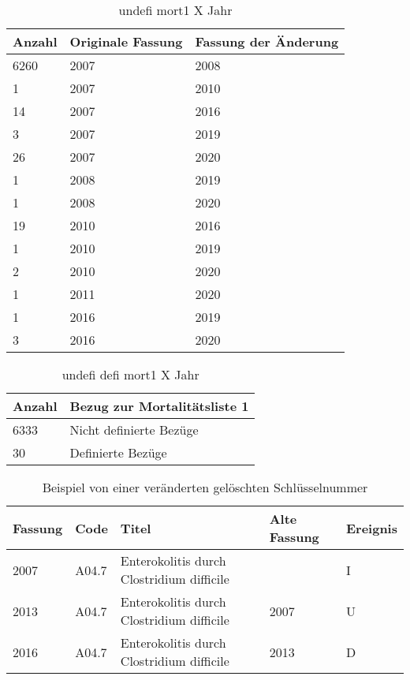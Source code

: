 \begin{table}[ht]
	\centering
	\caption[Undefinierte Bezüge zur Mortalitätsliste 1]{undefi mort1 X Jahr}
	\label{tab:mort1}
	\begin{tabular}{|l|l|l|}
		\hline
		\rowcolor{lightgray} Anzahl & Originale Fassung & Fassung der Änderung \\ \hline
		6260 & 2007 & 2008 \\ \hline
		1 & 2007 & 2010 \\ \hline
		14 & 2007 & 2016 \\ \hline
		3 & 2007 & 2019 \\ \hline
		26 & 2007 & 2020 \\ \hline
		1 & 2008 & 2019 \\ \hline
		1 & 2008 & 2020 \\ \hline
		19 & 2010 & 2016 \\ \hline
		1 & 2010 & 2019 \\ \hline
		2 & 2010 & 2020 \\ \hline
		1 & 2011 & 2020 \\ \hline
		1 & 2016 & 2019 \\ \hline
		3 & 2016 & 2020 \\ \hline	
	\end{tabular}
\end{table}

\newpage

\begin{table}[ht]
	\centering
	\caption[Undefinierte und definierte Bezüge zur Mortalitätsliste 1]{undefi defi mort1 X Jahr}
	\label{tab:mort1defundef}
	\begin{tabular}{|l|l|}
		\hline
		\rowcolor{lightgray} Anzahl & Bezug zur Mortalitätsliste 1 \\ \hline
		6333 & Nicht definierte Bezüge \\ \hline
		30 & Definierte Bezüge \\ \hline		
	\end{tabular}
\end{table}

\newpage


\begin{table}[ht]
	\centering
	\small
	\caption[Veränderte gelöschte Schlüsselnummer]{Beispiel von einer veränderten gelöschten Schlüsselnummer}
	\label{tab:IUD}
	\begin{tabular}{|l|l|p{6cm}|l|l|}
		\hline
		\rowcolor{lightgray} Fassung & Code & Titel & Alte Fassung & Ereignis \\ \hline
		2007 & A04.7 & Enterokolitis durch Clostridium difficile  &  & I \\ \hline
		2013 & A04.7 & Enterokolitis durch Clostridium difficile  & 2007 & U \\ \hline
		2016 & A04.7 & Enterokolitis durch Clostridium difficile  & 2013 & D \\ \hline
	\end{tabular}
\end{table}

